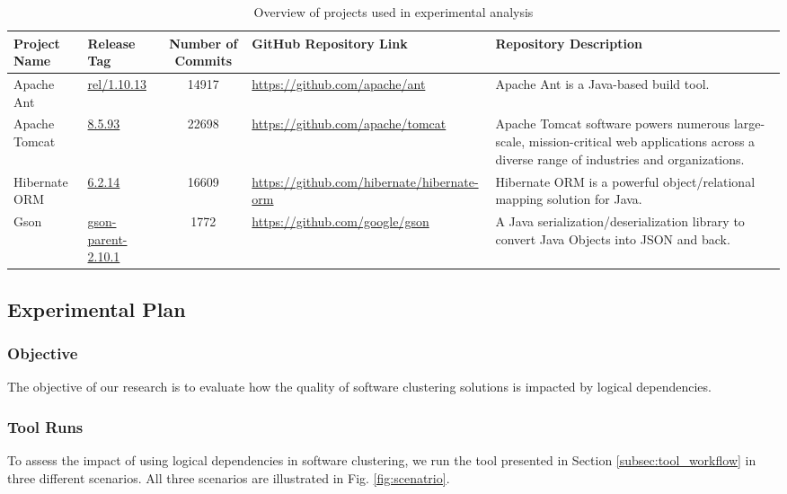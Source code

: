 \documentclass{ieeeaccess}
\begin{document}
\begin{table}
\centering
\caption{Overview of projects used in experimental analysis}
\label{tab:project_info}
\setlength{\tabcolsep}{7pt} 
\begin{tabular}{|l|l|c|l|p{4cm}|}
\hline
\textbf{Project Name} & \textbf{Release Tag} & \textbf{Number of Commits} & \textbf{GitHub Repository Link} & \textbf{Repository Description} \\ \hline
Apache Ant & \href{https://github.com/apache/ant/tree/rel/1.10.13}{rel/1.10.13} & 14917 & \href{https://github.com/apache/ant}{https://github.com/apache/ant} & Apache Ant is a Java-based build tool. \\ \hline
Apache Tomcat & \href{https://github.com/apache/tomcat/tree/8.5.93}{8.5.93} & 22698 & \href{https://github.com/apache/tomcat}{https://github.com/apache/tomcat} & Apache Tomcat software powers numerous large-scale, mission-critical web applications across a diverse range of industries and organizations. \\ \hline
Hibernate ORM & \href{https://github.com/hibernate/hibernate-orm/tree/6.2.14}{6.2.14} & 16609 & \href{https://github.com/hibernate/hibernate-orm}{https://github.com/hibernate/hibernate-orm} & Hibernate ORM is a powerful object/relational mapping solution for Java. \\ \hline
Gson & \href{https://github.com/google/gson/tree/gson-parent-2.10.1}{gson-parent-2.10.1} & 1772 & \href{https://github.com/google/gson}{https://github.com/google/gson} & A Java serialization/deserialization library to convert Java Objects into JSON and back. \\ \hline
\end{tabular}
\end{table}

\subsection{Experimental Plan}
\label{subsec:plan}

\subsubsection{Objective}
The objective of our research is to evaluate how the quality of software clustering solutions is impacted by logical dependencies.

\subsubsection{Tool Runs}
To assess the impact of using logical dependencies in software clustering, we run the tool presented in Section \ref{subsec:tool_workflow} in three different scenarios. All three scenarios are illustrated in Fig. \ref{fig:scenatrio}.
\end{document}
